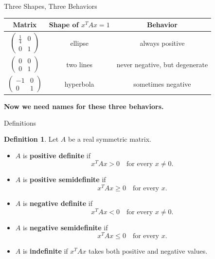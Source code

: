\documentclass[10pt]{beamer}
\theoremstyle{definition}
\newtheorem{defi}{Definition}[section]
\newcommand{\x}[1]{\alert{\textbf{#1}}}
\begin{document}
\begin{frame}{Three Shapes, Three Behaviors}

\begin{center}
\renewcommand{\arraystretch}{1.35}
\begin{tabular}{c|c|c}
\textbf{Matrix} & \textbf{Shape of $x^TAx=1$} & \textbf{Behavior}\\
\hline
$\begin{pmatrix}\frac14&0\\0&1\end{pmatrix}$ & ellipse & always positive\\
$\begin{pmatrix}0&0\\0&1\end{pmatrix}$ & two lines & never negative, but degenerate\\
$\begin{pmatrix}-1&0\\0&1\end{pmatrix}$ & hyperbola & sometimes negative
\end{tabular}
\end{center}

\vfill

\begin{center}
\x{Now we need names for these three behaviors.}
\end{center}

\end{frame}


\begin{frame}[shrink=7]{Definitions}

\begin{defi}
Let $A$ be a real symmetric matrix.
\begin{itemize}
\item $A$ is \x{positive definite} if
$$
x^TAx>0\quad\text{for every }x\ne0.
$$
\item $A$ is \x{positive semidefinite} if
$$
x^TAx\ge0\quad\text{for every }x.
$$
\item $A$ is \x{negative definite} if
$$
x^TAx<0\quad\text{for every }x\ne0.
$$
\item $A$ is \x{negative semidefinite} if
$$
x^TAx\le0\quad\text{for every }x.
$$
\item $A$ is \x{indefinite} if $x^TAx$ takes both positive and negative values.
\end{itemize}
\end{defi}

\end{frame}
\end{document}
